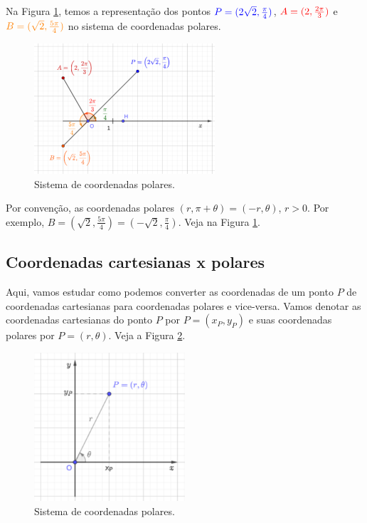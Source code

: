 \begin{ex}
  Na Figura \ref{fig:ex_osc_scp}, temos a representação dos pontos ${\color{blue}P=(2\sqrt{2}, \frac{\pi}{4})}$, ${\color{red}A=(2, \frac{2\pi}{3})}$ e ${\color{orange}B=(\sqrt{2}, \frac{5\pi}{4})}$ no sistema de coordenadas polares.

\begin{figure}[H]
  \centering
  \includegraphics[width=0.6\textwidth]{cap_osc/dados/fig_ex_osc_scp/fig}
  \caption{Sistema de coordenadas polares.}
  \label{fig:ex_osc_scp}
\end{figure}  
\end{ex}

\begin{obs}
  Por convenção, as coordenadas polares $(r, \pi + \theta) = (-r, \theta)$, $r>0$. Por exemplo, $B=(\sqrt{2}, \frac{5\pi}{4}) = (-\sqrt{2}, \frac{\pi}{4})$. Veja na Figura \ref{fig:ex_osc_scp}.
\end{obs}

\subsection{Coordenadas cartesianas x polares}

Aqui, vamos estudar como podemos converter as coordenadas de um ponto $P$ de coordenadas cartesianas para coordenadas polares e vice-versa. Vamos denotar as coordenadas cartesianas do ponto $P$ por $P=(x_P, y_P)$ e suas coordenadas polares por $P=(r, \theta)$. Veja a Figura \ref{fig:osc_ccxcp}.

\begin{figure}[H]
  \centering
  \includegraphics[width=0.5\textwidth]{cap_osc/dados/fig_osc_ccxcp/fig}
  \caption{Sistema de coordenadas polares.}
  \label{fig:osc_ccxcp}
\end{figure}  

